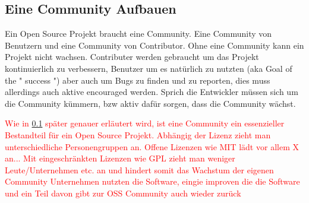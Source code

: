\subsection{Eine Community Aufbauen} \label{ssec:Eine Community Aufbauen}




\noindent
Ein Open Source Projekt braucht eine Community.
Eine Community von Benutzern und eine Community von Contributor. Ohne eine Community kann ein Projekt
nicht wachsen. Contributer werden gebraucht um das Projekt kontinuierlich zu verbessern, Benutzer um
es natürlich zu nutzten (aka Goal of the " success ") aber auch um Bugs zu finden und zu reporten,
dies muss allerdings auch aktive encouraged werden. \cite{bangerthWhatMakesComputational2013} 
Sprich die Entwickler müssen sich um die
Community kümmern, bzw aktiv dafür sorgen, dass die Community wächst. 


\textcolor{red}{
    Wie in \ref{ssec:Eine Community Aufbauen} später genauer erläutert wird, ist eine Community ein 
    essenzieller Bestandteil für ein Open Source Projekt.
    Abhängig der Lizenz zieht man unterschiedliche Personengruppen an.
    Offene Lizenzen wie MIT lädt vor allem X an...
    Mit eingeschränkten Lizenzen wie GPL zieht man weniger Leute/Unternehmen etc. an und hindert 
    somit das Wachstum der eigenen Community 
    Unternehmen nutzten die Software, 
    eingie improven die die Software und ein Teil davon gibt zur OSS Community auch wieder zurück 
    \cite{bangerthWhatMakesComputational2013} %
    }


